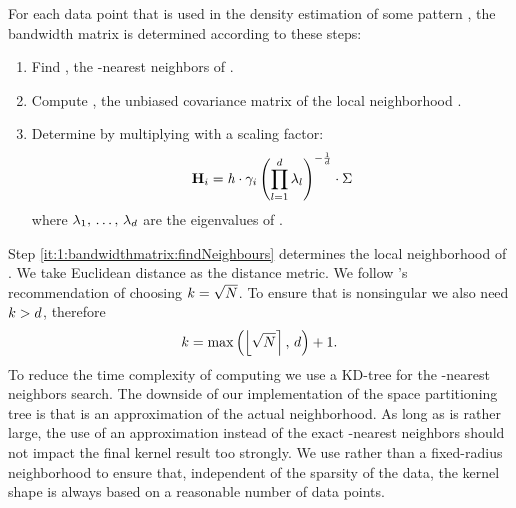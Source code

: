 	For each data point \varPattern[\itXis] that is used in the density estimation of some pattern \varPattern[\itXs], the bandwidth matrix is determined according to these steps:
		\begin{enumerate}[labelindent=0ex]
			\item \label{it:1:bandwidthmatrix:findNeighbours}
				Find \varNeighborhood{\varPattern[\itXis]}, the \KNNK-nearest neighbors of \varPattern[\itXis].
			\item \label{it:1:bandwidthmatrix:initialBandwidthMatrix}
				Compute \varCovarianceMatrix, the unbiased covariance matrix of the local neighborhood \varNeighborhood{\varPattern[\itXis]}.
			\item \label{it:1:bandwidthmatrix:scaleBandwidhtMatrix}
				Determine \varBandwidthMatrix[\itXis] by multiplying \varCovarianceMatrix with a scaling factor:
				\begin{equation}\label{eq:method:scalingFactor}
					\varBandwidthMatrix[\itXis] = \varBandwidth \cdot \varLocalBandwidth{\itXis}
				 \left( \displaystyle\prod_{\itDim = 1}^{\varDim} \varEigenValue_\itDim \right)^{-\frac{1}{\varDim}} \cdot \varCovarianceMatrix
				\end{equation}
				where $\lambda_1,\, \dotsc,\, \lambda_d$ are the eigenvalues of \varCovarianceMatrix.
		\end{enumerate}
		Step \ref{it:1:bandwidthmatrix:findNeighbours} determines the local neighborhood of \varPattern[\itXis]. We take Euclidean distance as the distance metric.
		We follow \citeauthor{silverman1986density}'s \cite{silverman1986density} recommendation of choosing $k = \sqrt{N}$. To ensure that \varCovarianceMatrix is nonsingular we also need $k > d$, therefore
		\begin{equation}\label{eq:method:k}
			k = \max\left(\left\lfloor \sqrt{N} \right\rceil,\, d \right) + 1.
		\end{equation}
		To reduce the time complexity of computing \varBandwidthMatrix[\itXis]we use a KD-tree for the \KNNK-nearest neighbors search\cite{Bentley1975Multidimensional}. The downside of our implementation of the space partitioning tree is that \varNeighborhood{\varPattern[\itXis]} is an approximation of the actual neighborhood. As long as \KNNK is rather large, the use of an approximation instead of the exact \KNNK-nearest neighbors should not impact the final kernel result too strongly.
		We use \KNN rather than a fixed-radius neighborhood to ensure that, independent of the sparsity of the data, the kernel shape is always based on a reasonable number of data points.

